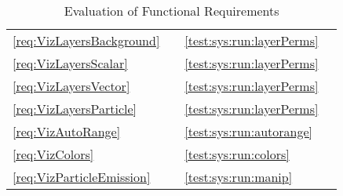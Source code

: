 \begin{table}[p]
\begin{tabular}{l|c|l|c}
        \ref{req:VizLayersBackground}  & \must{} & \ref{test:sys:run:layerPerms} & \testsuccess{}  \\
        \ref{req:VizLayersScalar}  & \must{} & \ref{test:sys:run:layerPerms} & \testsuccess{}      \\
        \ref{req:VizLayersVector}  & \must{} & \ref{test:sys:run:layerPerms} & \testsuccess{}      \\
        \ref{req:VizLayersParticle}  & \must{} & \ref{test:sys:run:layerPerms} & \testsuccess{}       \\
        \hline
        \ref{req:VizAutoRange} & \should{} & \ref{test:sys:run:autorange} & \testsuccess{}     \\
        \ref{req:VizColors} & \should{} & \ref{test:sys:run:colors}  & \testsuccess{}    \\
        \ref{req:VizParticleEmission} & \should{} & \ref{test:sys:run:manip} & \testsuccess{} \\
    \end{tabular}
    \caption{Evaluation of Functional Requirements}
    \label{tab:functional_req}
\end{table}

